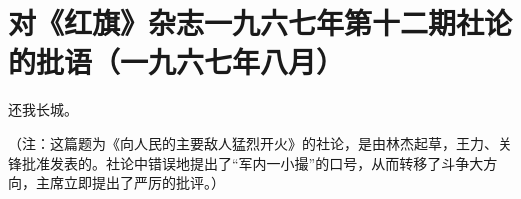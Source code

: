 \section[对《红旗》杂志一九六七年第十二期社论的批语（一九六七年八月）]{对《红旗》杂志一九六七年第十二期社论的批语（一九六七年八月）}


还我长城。

（注：这篇题为《向人民的主要敌人猛烈开火》的社论，是由林杰起草，王力、关锋批准发表的。社论中错误地提出了“军内一小撮”的口号，从而转移了斗争大方向，主席立即提出了严厉的批评。）


